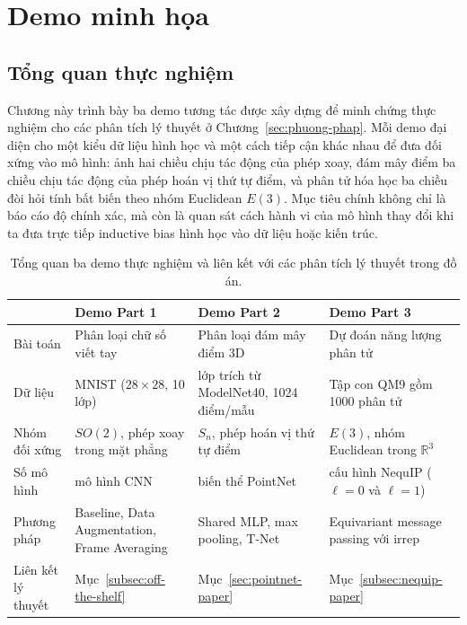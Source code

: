\section{Demo minh họa}
\label{sec:demo}

\subsection{Tổng quan thực nghiệm}
\label{subsec:tong-quan-thuc-nghiem}

Chương này trình bày ba demo tương tác được xây dựng để minh chứng thực nghiệm cho các phân tích lý thuyết ở Chương~\ref{sec:phuong-phap}. Mỗi demo đại diện cho một kiểu dữ liệu hình học và một cách tiếp cận khác nhau để đưa đối xứng vào mô hình: ảnh hai chiều chịu tác động của phép xoay, đám mây điểm ba chiều chịu tác động của phép hoán vị thứ tự điểm, và phân tử hóa học ba chiều đòi hỏi tính bất biến theo nhóm Euclidean $E(3)$. Mục tiêu chính không chỉ là báo cáo độ chính xác, mà còn là quan sát cách hành vi của mô hình thay đổi khi ta đưa trực tiếp inductive bias hình học vào dữ liệu hoặc kiến trúc.

\begin{table}[H]
\centering
\small
\renewcommand{\arraystretch}{1.2}
\begin{tabularx}{\textwidth}{p{}>{\raggedright\arraybackslash}X>{\raggedright\arraybackslash}X>{\raggedright\arraybackslash}X}
\toprule
& \textbf{Demo Part 1} & \textbf{Demo Part 2} & \textbf{Demo Part 3} \\
\midrule
Bài toán       & Phân loại chữ số viết tay    & Phân loại đám mây điểm 3D & Dự đoán năng lượng phân tử \\
Dữ liệu       & MNIST ($28\times28$, 10 lớp) & 5 lớp trích từ ModelNet40, 1024 điểm/mẫu & Tập con QM9 gồm 1000 phân tử \\
Nhóm đối xứng  & $SO(2)$, phép xoay trong mặt phẳng & $S_n$, phép hoán vị thứ tự điểm & $E(3)$, nhóm Euclidean trong $\mathbb{R}^3$ \\
Số mô hình     & 3 mô hình CNN & 2 biến thể PointNet & 2 cấu hình NequIP ($\ell=0$ và $\ell=1$) \\
Phương pháp    & Baseline, Data Augmentation, Frame Averaging & Shared MLP, max pooling, T-Net & Equivariant message passing với irrep \\
Liên kết lý thuyết & Mục~\ref{subsec:off-the-shelf} & Mục~\ref{sec:pointnet-paper} & Mục~\ref{subsec:nequip-paper} \\
\bottomrule
\end{tabularx}
\caption{Tổng quan ba demo thực nghiệm và liên kết với các phân tích lý thuyết trong đồ án.}
\label{tab:demo-overview}
\end{table}

